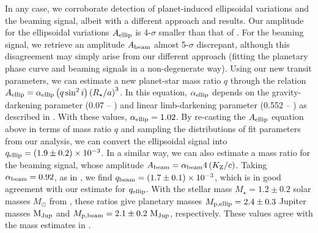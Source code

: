 \documentclass[manuscript]{aastex62}
\begin{document}
In any case, we corroborate detection of planet-induced ellipsoidal variations and the beaming signal, albeit with a different approach and results. Our amplitude for the ellipsoidal variations $A_{\rm ellip}$ is 4-$\sigma$ smaller than that of \citet{2013ApJ...771...26F}. For the beaming signal, we retrieve an amplitude $A_{\rm beam}$ almost 5-$\sigma$ discrepant, although this disagreement may simply arise from our different approach (fitting the planetary phase curve and beaming signals in a non-degenerate way). Using our new transit parameters, we can estimate a new planet-star mass ratio $q$ through the relation $A_{\rm ellip} = \alpha_{\rm ellip} \left( q \sin^2 i \right) \left( R_\star / a \right)^{3}$. In this equation, $\alpha_{\rm ellip}$ depends on the gravity-darkening parameter (0.07 -- \citealp{2011AA...529A..75C}) and linear limb-darkening parameter (0.552 -- \citealp{2015MNRAS.450.1879E}) as described in \citet{1985ApJ...295..143M}. With these values, $\alpha_{\rm ellip} = 1.02$. By re-casting the $A_{\rm ellip}$ equation above in terms of mass ratio $q$ and sampling the distributions of fit parameters from our analysis, we can convert the ellipsoidal signal into $q_{\rm ellip} = \left( 1.9 \pm 0.2 \right) \times 10^{-3}$. In a similar way, we can also estimate a mass ratio for the beaming signal, whose amplitude $A_{\rm beam} = \alpha_{\rm beam} 4 \left( K_{\rm Z} / c \right)$. Taking $\alpha_{\rm beam} = 0.92$, as in \citet{2013ApJ...771...26F}, we find $q_{\rm beam} = \left( 1.7\pm 0.1 \right) \times 10^{-3}$, which is in good agreement with our estimate for $q_{\rm ellip}$. With the stellar mass $M_\star = 1.2 \pm 0.2$ solar masses $M_{\odot}$ from \citet{2013ApJ...771...26F}, these ratios give planetary masses $M_{\rm p, ellip} = 2.4 \pm 0.3$ Jupiter masses ${\rm M_{Jup}}$ and $M_{\rm p, beam} = 2.1 \pm 0.2\ {\rm M_{Jup}}$, respectively. These values agree with the mass estimates in \citet{2013ApJ...771...26F}.
\end{document}
